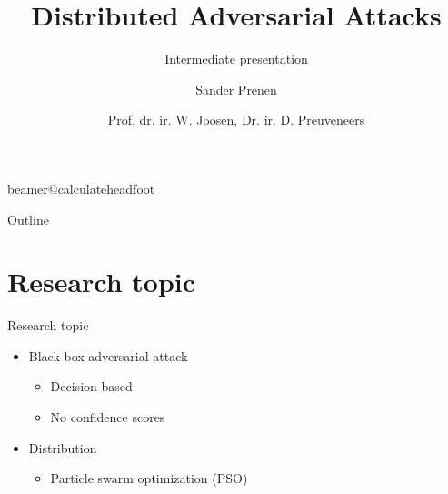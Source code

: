 \documentclass[11pt,t]{beamer}
\title[Distributed Adversarial Attacks]{Distributed Adversarial Attacks} %
\subtitle{Intermediate presentation}
\author{Sander Prenen}
\institute{Vera Rimmer, Ilias Tsingenopoulos}
\date{Prof. dr. ir. W. Joosen, Dr. ir. D. Preuveneers}
\begin{document}
\csname beamer@calculateheadfoot\endcsname %

\begin{frame}
	\titlepage
\end{frame}

\begin{frame}{Outline}
	\hfill	{\large \parbox{.961\textwidth}{\tableofcontents[hideothersubsections]}}
\end{frame}

\section{Research topic}
\begin{frame}{Research topic}
\begin{itemize}
	\item Black-box adversarial attack
	\begin{itemize}
		\item Decision based
		\item No confidence scores
	\end{itemize}

	\item Distribution
	\begin{itemize}
		\item Particle swarm optimization (PSO)
	\end{itemize}
\end{itemize}
\end{frame}
\end{document}
